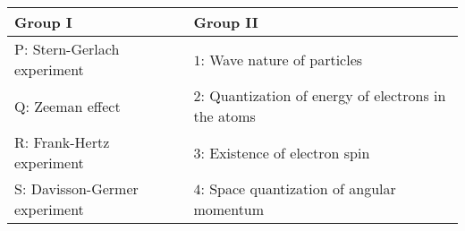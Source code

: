 \begin{table}[h!]
    \centering
    \begin{tabular}{|p{3cm}|p{5cm}|}
        \hline
        \textbf{Group I} &  \textbf{Group II}  \\ \hline
        P: Stern-Gerlach experiment & $1$: Wave nature of particles \\ \hline
        Q:  Zeeman effect & $2$: Quantization of energy of electrons in the atoms \\ \hline
        R:  Frank-Hertz experiment & $3$: Existence of electron spin \\ \hline
        S: Davisson-Germer experiment & $4$: Space quantization of angular momentum \\ \hline
    \end{tabular}
\end{table}
